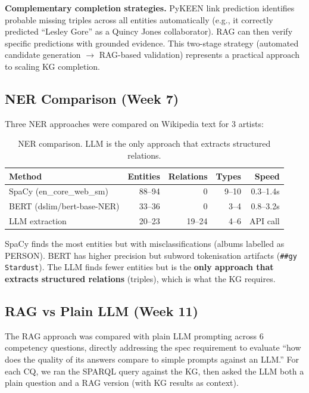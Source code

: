 \documentclass[11pt,a4paper]{article}
\begin{document}
\textbf{Complementary completion strategies.} PyKEEN link prediction identifies probable missing triples across all entities automatically (e.g., it correctly predicted ``Lesley Gore'' as a Quincy Jones collaborator). RAG can then verify specific predictions with grounded evidence. This two-stage strategy (automated candidate generation $\rightarrow$ RAG-based validation) represents a practical approach to scaling KG completion.

\subsection{NER Comparison (Week 7)}

Three NER approaches were compared on Wikipedia text for 3 artists:

\begin{table}[h]
\centering
\begin{tabular}{lrrrr}
\toprule
\textbf{Method} & \textbf{Entities} & \textbf{Relations} & \textbf{Types} & \textbf{Speed} \\
\midrule
SpaCy (en\_core\_web\_sm) & 88--94 & 0 & 9--10 & 0.3--1.4s \\
BERT (dslim/bert-base-NER) & 33--36 & 0 & 3--4 & 0.8--3.2s \\
LLM extraction & 20--23 & 19--24 & 4--6 & API call \\
\bottomrule
\end{tabular}
\caption{NER comparison. LLM is the only approach that extracts structured relations.}
\end{table}

SpaCy finds the most entities but with misclassifications (albums labelled as PERSON). BERT has higher precision but subword tokenisation artifacts (\texttt{\#\#gy Stardust}). The LLM finds fewer entities but is the \textbf{only approach that extracts structured relations} (triples), which is what the KG requires.

\subsection{RAG vs Plain LLM (Week 11)}

The RAG approach was compared with plain LLM prompting across 6 competency questions, directly addressing the spec requirement to evaluate ``how does the quality of its answers compare to simple prompts against an LLM.'' For each CQ, we ran the SPARQL query against the KG, then asked the LLM both a plain question and a RAG version (with KG results as context).
\end{document}
